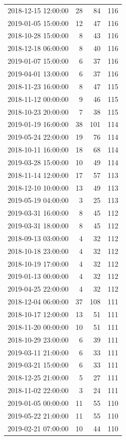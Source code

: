 \begin{tabular}{lrrr}
2018-12-15 12:00:00 & 28 & 84 & 116 \\
2019-01-05 15:00:00 & 12 & 47 & 116 \\
2018-10-28 15:00:00 & 8 & 43 & 116 \\
2018-12-18 06:00:00 & 8 & 40 & 116 \\
2019-01-07 15:00:00 & 6 & 37 & 116 \\
2019-04-01 13:00:00 & 6 & 37 & 116 \\
2018-11-23 16:00:00 & 8 & 47 & 115 \\
2018-11-12 00:00:00 & 9 & 46 & 115 \\
2018-10-23 20:00:00 & 7 & 38 & 115 \\
2019-01-19 16:00:00 & 38 & 101 & 114 \\
2019-05-24 22:00:00 & 19 & 76 & 114 \\
2018-10-11 16:00:00 & 18 & 68 & 114 \\
2019-03-28 15:00:00 & 10 & 49 & 114 \\
2018-11-14 12:00:00 & 17 & 57 & 113 \\
2018-12-10 10:00:00 & 13 & 49 & 113 \\
2019-05-19 04:00:00 & 3 & 25 & 113 \\
2019-03-31 16:00:00 & 8 & 45 & 112 \\
2019-03-31 18:00:00 & 8 & 45 & 112 \\
2018-09-13 03:00:00 & 4 & 32 & 112 \\
2018-10-18 23:00:00 & 4 & 32 & 112 \\
2018-10-19 17:00:00 & 4 & 32 & 112 \\
2019-01-13 00:00:00 & 4 & 32 & 112 \\
2019-04-25 22:00:00 & 4 & 32 & 112 \\
2018-12-04 06:00:00 & 37 & 108 & 111 \\
2018-10-17 12:00:00 & 13 & 51 & 111 \\
2018-11-20 00:00:00 & 10 & 51 & 111 \\
2018-10-29 23:00:00 & 6 & 39 & 111 \\
2019-03-11 21:00:00 & 6 & 33 & 111 \\
2019-03-21 15:00:00 & 6 & 33 & 111 \\
2018-12-25 21:00:00 & 5 & 27 & 111 \\
2018-11-02 22:00:00 & 3 & 24 & 111 \\
2019-01-05 00:00:00 & 11 & 55 & 110 \\
2019-05-22 21:00:00 & 11 & 55 & 110 \\
2019-02-21 07:00:00 & 10 & 44 & 110 \\

\end{tabular}
